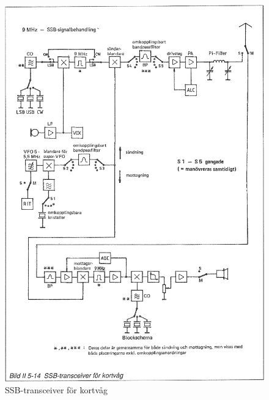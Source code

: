 \begin{figure}
  \includegraphics[width=\textwidth]{images/bild_2_5-14}
  \caption{SSB-transceiver för kortvåg}
  \label{fig:bildII5-14}
\end{figure}

